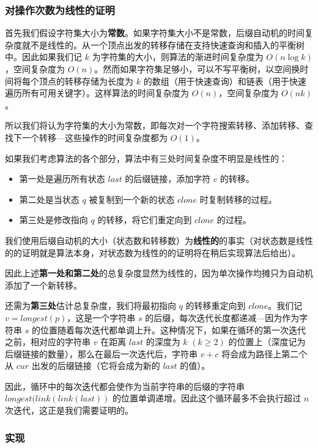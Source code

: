\subsubsection{对操作次数为线性的证明}

首先我们假设字符集大小为\textbf{常数}。如果字符集大小不是常数，后缀自动机的时间复杂度就不是线性的。从一个顶点出发的转移存储在支持快速查询和插入的平衡树中。因此如果我们记 $k$ 为字符集的大小，则算法的渐进时间复杂度为 $O(n\log k)$，空间复杂度为 $O(n)$。然而如果字符集足够小，可以不写平衡树，以空间换时间将每个顶点的转移存储为长度为 $k$ 的数组（用于快速查询）和链表（用于快速遍历所有可用关键字）。这样算法的时间复杂度为 $O(n)$，空间复杂度为 $O(nk)$。

所以我们将认为字符集的大小为常数，即每次对一个字符搜索转移、添加转移、查找下一个转移—这些操作的时间复杂度都为 $O(1)$。

如果我们考虑算法的各个部分，算法中有三处时间复杂度不明显是线性的：

\begin{itemize}
\item 第一处是遍历所有状态 $last$ 的后缀链接，添加字符 $c$ 的转移。
\item 第二处是当状态 $q$ 被复制到一个新的状态 $clone$ 时复制转移的过程。
\item 第三处是修改指向 $q$ 的转移，将它们重定向到 $clone$ 的过程。
\end{itemize}

我们使用后缀自动机的大小（状态数和转移数）为\textbf{线性的}的事实（对状态数是线性的的证明就是算法本身，对状态数为线性的的证明将在稍后实现算法后给出）。

因此上述\textbf{第一处和第二处}的总复杂度显然为线性的，因为单次操作均摊只为自动机添加了一个新转移。

还需为\textbf{第三处}估计总复杂度，我们将最初指向 $q$ 的转移重定向到 $clone$。我们记 $v=longest(p)$，这是一个字符串 $s$ 的后缀，每次迭代长度都递减—因为作为字符串 $s$ 的位置随着每次迭代都单调上升。这种情况下，如果在循环的第一次迭代之前，相对应的字符串 $v$ 在距离 $last$ 的深度为 $k$ $(k\ge2)$ 的位置上（深度记为后缀链接的数量），那么在最后一次迭代后，字符串 $v+c$ 将会成为路径上第二个从 $cur$ 出发的后缀链接（它将会成为新的 $last$ 的值）。

因此，循环中的每次迭代都会使作为当前字符串的后缀的字符串 $longest(link(link(last))$ 的位置单调递增。因此这个循环最多不会执行超过 $n$ 次迭代，这正是我们需要证明的。

\subsubsection{实现}

